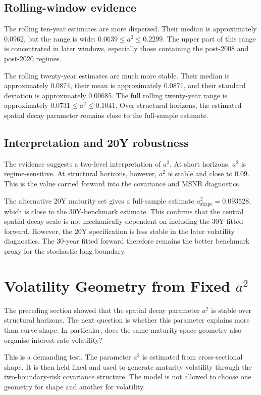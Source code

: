 \documentclass[11pt]{article}
\begin{document}
\subsection{Rolling-window evidence}

The rolling ten-year estimates are more dispersed. Their median is approximately 0.0962, but the range is wide: $0.0639\leq a^2\leq 0.2299$. The upper part of this range is concentrated in later windows, especially those containing the post-2008 and post-2020 regimes.

The rolling twenty-year estimates are much more stable. Their median is approximately 0.0874, their mean is approximately 0.0871, and their standard deviation is approximately 0.00685. The full rolling twenty-year range is approximately $0.0731\leq a^2\leq 0.1041$. Over structural horizons, the estimated spatial decay parameter remains close to the full-sample estimate.

\subsection{Interpretation and 20Y robustness}

The evidence suggests a two-level interpretation of $a^2$. At short horizons, $a^2$ is regime-sensitive. At structural horizons, however, $a^2$ is stable and close to 0.09. This is the value carried forward into the covariance and MSNR diagnostics.

The alternative 20Y maturity set gives a full-sample estimate $a^2_{\mathrm{shape}}=0.093528$, which is close to the 30Y-benchmark estimate. This confirms that the central spatial decay scale is not mechanically dependent on including the 30Y fitted forward. However, the 20Y specification is less stable in the later volatility diagnostics. The 30-year fitted forward therefore remains the better benchmark proxy for the stochastic long boundary.

\section{Volatility Geometry from Fixed $a^2$}

The preceding section showed that the spatial decay parameter $a^2$ is stable over structural horizons. The next question is whether this parameter explains more than curve shape. In particular, does the same maturity-space geometry also organise interest-rate volatility?

This is a demanding test. The parameter $a^2$ is estimated from cross-sectional shape. It is then held fixed and used to generate maturity volatility through the two-boundary-risk covariance structure. The model is not allowed to choose one geometry for shape and another for volatility.
\end{document}
